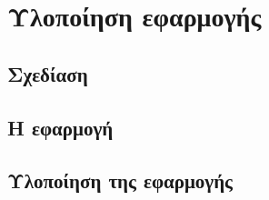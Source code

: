 \chapter{Υλοποίηση εφαρμογής} \label{ch:unitask}

    \section{Σχεδίαση}
    \section{Η εφαρμογή}
    \section{Υλοποίηση της εφαρμογής}